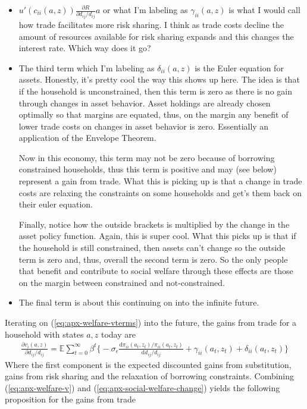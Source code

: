 \documentclass[12pt,pdftex]{article}
\begin{document}
\begin{onehalfspacing}
\begin{itemize}
\item $u'(c_{ii}(a,z))\frac{\partial R}{\partial d_{ij} / d_{ij}}a$ or what I'm labeling as $\gamma_{ii}(a,z)$ is what I would call how trade facilitates more risk sharing. I think as trade costs decline the amount of resources available for risk sharing expands and this changes the interest rate. Which way does it go?

\item The third term which I'm labeling as $\delta_{ii}(a,z)$  is the Euler equation for assets. Honestly, it's pretty cool the way this shows up here. The idea is that if the household is unconstrained, then this term is zero as there is no gain through changes in asset behavior. Asset holdings are already chosen optimally so that margins are equated, thus, on the margin any benefit of lower trade costs on changes in asset behavior is zero. Essentially an application of the Envelope Theorem.

    Now in this economy, this term may not be zero because of borrowing constrained households, thus this term is positive and may (see below) represent a gain from trade. What this is picking up is that a change in trade costs are relaxing the constraints on some households and get's them back on their euler equation.

    Finally, notice how the outside brackets is multiplied by the change in the asset policy function. Again, this is super cool. What this picks up is that if the household is still constrained, then assets can't change so the outside term is zero and, thus, overall the second term is zero. So the only people that benefit and contribute to social welfare through these effects are those on the margin between constrained and not-constrained.

\item The final term is about this continuing on into the infinite future.
\end{itemize}
Iterating on (\ref{eq:apx-welfare-vterms}) into the future, the gains from trade for a household with states $a,z$ today are
\begin{align}
\frac{\partial v_i(a, z)}{\partial d_{ij} / d_{ij}} = \mathbb{E} \sum_{t = 0}^{\infty} \beta^{t} \bigg \{ -\sigma_{\epsilon} \frac{\mathrm{d} \pi_{ii}(a_{t},z_{t}) / \pi_{ii}(a_{t},z_{t})}{\mathrm{d}d_{ij} / d_{ij}} + \gamma_{ii}(a_{t},z_{t}) + \delta_{ii}(a_{t},z_{t}) \bigg \}
\label{eq:apx-welfare-v}
\end{align}
Where the first component is the expected discounted gains from substitution, gains from risk sharing and the relaxation of borrowing constraints. Combining (\ref{eq:apx-welfare-v}) and (\ref{eq:apx-social-welfare-change}) yields the following proposition for the gains from trade


\end{onehalfspacing}
\end{document}
